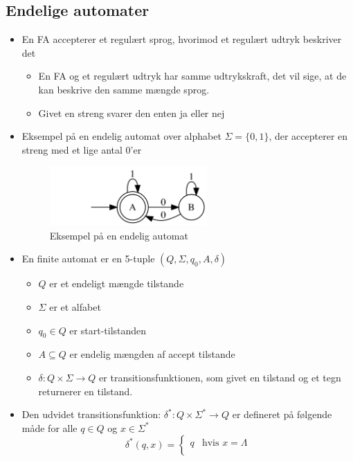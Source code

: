 \documentclass[a4, danish]{article}
\begin{document}
  \subsection{Endelige automater}
  \begin{itemize}
    \item En FA accepterer et regulært sprog, hvorimod et regulært udtryk beskriver det
    \begin{itemize}
      \item En FA og et regulært udtryk har samme udtrykskraft, det vil sige, at de kan beskrive den samme mængde sprog. 
      \item Givet en streng svarer den enten ja eller nej 
    \end{itemize}
    \item Eksempel på en endelig automat over alphabet $\Sigma=\{0,1\}$, der accepterer en streng med et lige antal 0'er
    \begin{figure}[ht!]
	  \centering
	  \includegraphics[width=60mm]{img/FAeks.png}
	  \caption{Eksempel på en endelig automat	\label{FAeks1}}
    \end{figure}
    \item En finite automat er en 5-tuple $(Q, \Sigma, q_0, A, \delta)$
    \begin{itemize}
	    \item $Q$ er et endeligt mængde tilstande
      \item $\Sigma$ er et alfabet
      \item $q_0 \in Q$ er start-tilstanden
      \item $A \subseteq Q$ er endelig mængden af accept tilstande
      \item $\delta: Q \times \Sigma \rightarrow Q$ er transitionsfunktionen, som givet en tilstand og et tegn returnerer en tilstand. 
    \end{itemize}
    \item Den udvidet transitionsfunktion: $\delta^*: Q \times \Sigma^* \rightarrow Q$ er defineret på følgende måde for alle $q\in Q$ og $x \in \Sigma^*$
 	 	\begin{equation*}
		\delta^*(q,x) =
		\begin{cases}
			\mbox{$q$} & \mbox{hvis $x = \Lambda$} \\

\end{cases}
\end{equation*}
\end{itemize}
\end{document}
